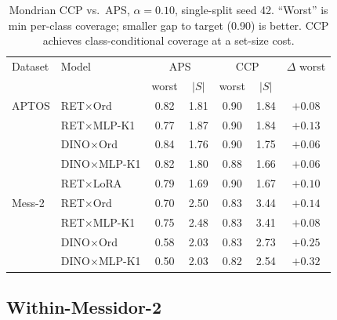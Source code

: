 \documentclass[journal]{IEEEtran}
\begin{document}
\begin{table}[!t]
    \caption{Mondrian CCP vs.\ APS, $\alpha=0.10$, single-split seed 42. ``Worst'' is min per-class coverage; smaller gap to target (0.90) is better. CCP achieves class-conditional coverage at a set-size cost.}
    \label{tab:ccp}
    \centering
    \footnotesize
    \begin{tabular}{@{}llccccc@{}}
        \toprule
        Dataset & Model              & \multicolumn{2}{c}{APS} & \multicolumn{2}{c}{CCP} & $\Delta$ worst                            \\
                &                    & worst                   & $|S|$                   & worst          & $|S|$ &                  \\
        \midrule
        APTOS   & RET$\times$Ord     & 0.82                    & 1.81                    & 0.90           & 1.84  & $+0.08$           \\
                & RET$\times$MLP-K1  & 0.77                    & 1.87                    & 0.90           & 1.84  & $+0.13$           \\
                & DINO$\times$Ord    & 0.84                    & 1.76                    & 0.90           & 1.75  & $+0.06$           \\
                & DINO$\times$MLP-K1 & 0.82                    & 1.80                    & 0.88           & 1.66  & $+0.06$           \\
                & RET$\times$LoRA    & 0.79                    & 1.69                    & 0.90           & 1.67  & $+0.10$           \\
        \midrule
        Mess-2  & RET$\times$Ord     & 0.70                    & 2.50                    & 0.83           & 3.44  & $+0.14$           \\
                & RET$\times$MLP-K1  & 0.75                    & 2.48                    & 0.83           & 3.41  & $+0.08$           \\
                & DINO$\times$Ord    & 0.58                    & 2.03                    & 0.83           & 2.73  & $+0.25$           \\
                & DINO$\times$MLP-K1 & 0.50                    & 2.03                    & 0.82           & 2.54  & $\mathbf{+0.32}$  \\
        \bottomrule
    \end{tabular}
\end{table}

\subsection{Within-Messidor-2}
\label{sec:messidor-within}
\end{document}
